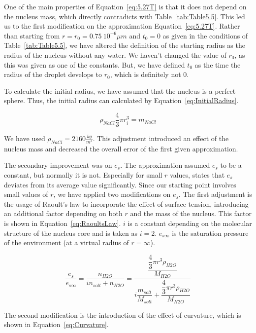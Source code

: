 \documentclass[]{article}
\begin{document}
One of the main properties of Equation~\eqref{eq:5.27T} is that it does not
depend on the nucleus mass, which directly contradicts with
Table~\ref{tab:Table5.5}. This led us to the first modification on the
approximation Equation~\eqref{eq:5.27T}. Rather than starting from
$r=r_{0}=0.75\ 10^{-6} \mu m$ and $t_{0}=0$ as given in the conditions of
Table~\ref{tab:Table5.5}, we have altered the definition of the starting radius
as the radius of the nucleus without any water. We haven't changed the value of
$r_{0}$, as this was given as one of the constants. But, we have defined
$t_{0}$ as the time the radius of the droplet develops to $r_{0}$, which is
definitely not $0$.

To calculate the initial radius, we have assumed that the nucleus is a perfect
sphere. Thus, the initial radius can calculated by
Equation~\eqref{eq:InitialRadius}.

\begin{equation} \label{eq:InitialRadius} \rho_{NaCl}\frac{4}{3}\pi
    r_{i}^{3}=m_{NaCl} \end{equation}

We have used $\rho_{NaCl}=2160 \frac{kg}{m^{3}}$. This adjustment introduced an
effect of the nucleus mass and decreased the overall error of the first given
approximation.

The secondary improvement was on $e_{s}$. The approximation assumed $e_{s}$ to
be a constant, but normally it is not. Especially for small $r$ values,
\cite{Best} states that $e_{s}$ deviates from its average value significantly.
Since our starting point involves small values of $r$, we have applied two
modifications on $e_{s}$. The first adjustment is the usage of Raoult's law to
incorporate the effect of surface tension, introducing an additional factor
depending on both $r$ and the mass of the nucleus. This factor is shown in
Equation~\eqref{eq:RaoultsLaw}. $i$ is a constant depending on the molecular
structure of the nucleus core and is taken as $i=2$. $e_{s\infty}$ is the
saturation pressure of the environment (at a virtual radius of $r=\infty$).

\begin{equation}
    \label{eq:RaoultsLaw}
    \dfrac{e_{s}}{e_{s\infty}}=\dfrac{n_{H2O}}{i n_{solt}+n_{H2O}}=\dfrac{\dfrac{\dfrac{4}{3}\pi r^{3} \rho_{H2O}}{M_{H2O}}}{i \dfrac{m_{solt}}{M_{solt}} + \dfrac{\dfrac{4}{3}\pi r^{3} \rho_{H2O}}{M_{H2O}}}
\end{equation}

The second modification is the introduction of the effect of curvature, which
is shown in Equation~\eqref{eq:Curvature}.
\end{document}
